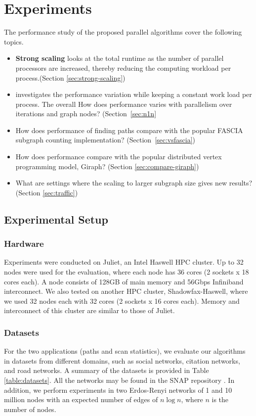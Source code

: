 \section{Experiments}
\label{sec:experiments}
The performance study of the proposed parallel algorithms cover the following topics.

\begin{itemize}
\item 
\textbf{Strong scaling} looks at the total runtime as the number of parallel processors are increased, thereby reducing the computing workload per process.(Section \ref{sec:strong-scaling})
\item
{} investigates the performance variation  while keeping a constant work load per process. The overall
How does performance varies with parallelism over iterations and graph nodes? (Section~\ref{sec:n1n}
\item
How does performance of finding paths compare with the popular FASCIA~\cite{6877274} subgraph counting implementation? (Section~\ref{sec:vsfascia})
\item
How does performance compare with the popular distributed vertex programming model,
Giraph? (Section \ref{sec:compare-giraph})
\item
What are settings where the scaling to larger subgraph size gives new results? (Section \ref{sec:traffic})
\end{itemize}

\subsection{Experimental Setup}
\subsubsection{Hardware}
Experiments were conducted on Juliet, an Intel Haswell HPC cluster. Up to 32 nodes were used for the evaluation, where each node has 36 cores (2 sockets x 18 cores each). A node consists of 128GB of main memory and 56Gbps Infiniband interconnect. We also tested on another HPC cluster, Shadowfax-Haswell, where we used 32 nodes each with 32 cores (2 sockets x 16 cores each). Memory and interconnect of this cluster are similar to those of Juliet.

\subsubsection{Datasets}
For the two applications (paths and scan statistics), we evaluate our algorithms in datasets from different domains, such as social networks, citation networks, and road networks. A summary of the datasets is provided in Table \ref{table:datasets}. All the networks may be found in the SNAP repository \cite{snapnets}. In addition, we perform experiments in two Erdos-Renyi networks of 1 and 10 million nodes with an expected number of edges of $n\log n$, where $n$ is the number of nodes.

